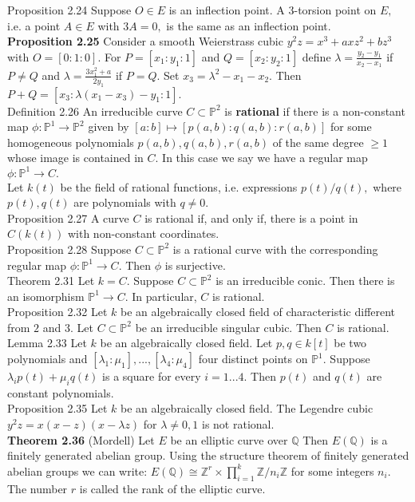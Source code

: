 \documentclass[8pt]{extarticle}
\begin{document}
Proposition 2.24 Suppose $O \in E$ is an inflection point. A $3$-torsion point on $E,$ i.e. a point $A \in E$ with
$3A = 0,$ is the same as an inflection point.\\
\textbf{Proposition 2.25} Consider a smooth Weierstrass cubic $y^2z = x^3 + axz^2 + bz^3$ with $O = [0 : 1 : 0].$ For $P =[x_1 :y_1 :1]$ and $Q=[x_2 :y_2 :1]$ define $\lambda=\frac{y_2-y_1}{x_2-x_1}$ if $P\neq Q$ and $\lambda=\frac{3x^2_1+a}{2y_1}$ if $P=Q.$ Set $x_3 =\lambda^2-x_1-x_2.$ Then $P+Q=[x_3 :\lambda(x_1-x_3)-y_1 :1].$\\
Definition 2.26 An irreducible curve $C \subset \mathbb{P}^2$ is \textbf{rational} if there is a non-constant map $\phi: \mathbb{P}^1 \rightarrow \mathbb{P}^2$ given by $[a : b] \mapsto [p(a, b) : q(a, b) : r(a, b)]$ for some homogeneous polynomials $p(a, b), q(a, b), r(a, b)$ of the same degree $\ge 1$ whose image is contained in $C.$ In this case we say we have a regular map $\phi: \mathbb{P}^1 \rightarrow C.$\\
Let $k(t)$ be the field of rational functions, i.e. expressions $p(t)/q(t),$ where $p(t), q(t)$ are polynomials with $q \neq 0.$\\
Proposition 2.27 A curve $C$ is rational if, and only if, there is a point in $C(k(t))$ with non-constant coordinates.\\
Proposition 2.28 Suppose $C \subset \mathbb{P}^2$ is a rational curve with the corresponding regular map $\phi: \mathbb{P}^1 \rightarrow C.$
Then $\phi$ is surjective.\\
Theorem 2.31 Let $k = C.$ Suppose $C \subset \mathbb{P}^2$ is an irreducible conic. Then there is an isomorphism $\mathbb{P}^1 \rightarrow C.$ In particular, $C$ is rational.\\
Proposition 2.32 Let $k$ be an algebraically closed field of characteristic different from $2$ and $3.$ Let $C \subset \mathbb{P}^2$ be an irreducible singular cubic. Then $C$ is rational.\\
Lemma 2.33 Let $k$ be an algebraically closed field. Let $p,q \in k[t]$ be two polynomials and $[\lambda_1 : \mu_1], ..., [\lambda_4 : \mu_4]$ four distinct points on $\mathbb{P}^1.$ Suppose $\lambda_ip(t) + \mu_iq(t)$ is a square for every $i = 1...4.$ Then $p(t)$ and $q(t)$ are constant polynomials.\\
Proposition 2.35 Let $k$ be an algebraically closed field. The Legendre cubic $y^2z = x(x-z)(x-\lambda z)$ for $\lambda\neq 0,1$ is not rational.\\
\textbf{Theorem 2.36} (Mordell) Let $E$ be an elliptic curve over $\mathbb{Q}$ Then $E(\mathbb{Q})$ is a finitely generated abelian group. Using the structure theorem of finitely generated abelian groups we can write: $E(\mathbb{Q})\cong \mathbb{Z}^r\times \prod_{i=1}^k \mathbb{Z}/n_i \mathbb{Z}$ for some integers $n_i.$ The number $r$ is called the rank of the elliptic curve.\\
\end{document}

